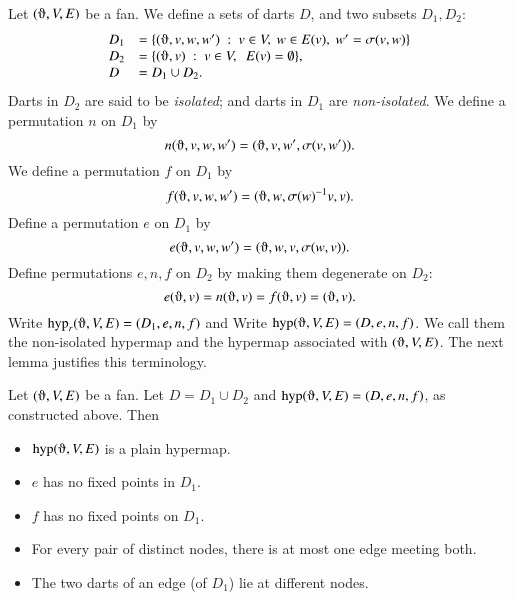 Let $(\orgn,V,E)$ be a fan.  We define a sets of darts $D$, and
two subsets $D_1,D_2$:
    $$
    \begin{array}{lll}
    D_1 &= \{(\orgn,v,w,w')\mid v\in V,\ w\in E(v),\ w' = \sigma(v,w)\}\\
    D_2 &= \{(\orgn,v) \mid v\in V,\ \ E(v) = \emptyset\},\\
    D   &= D_1\cup D_2.
    \end{array}
    $$
Darts in $D_2$ are said to be {\it isolated}; and darts in $D_1$ are {\it non-isolated}.
%
We define a permutation $n$ on $D_1$ by
    $$n(\orgn,v,w,w') = (\orgn,v,w',\sigma(v,w')).$$
We define a permutation $f$ on $D_1$ by
    $$
    f (\orgn,v,w,w') = (\orgn,w,\sigma(w)^{-1} v,v).
    $$
Define a permutation $e$ on $D_1$ by
    $$
    e (\orgn,v,w,w') = (\orgn,w,v,\sigma(w,v)).
    $$
Define permutations $e,n,f$ on $D_2$ by making them degenerate on $D_2$:
    $$
    e (\orgn,v) = n(\orgn,v) = f(\orgn,v) = (\orgn,v).
    $$
Write $\op{hyp}_r(\orgn,V,E)=(D_1,e,n,f)$ and
Write $\op{hyp}(\orgn,V,E)=(D,e,n,f)$.  We call them the non-isolated hypermap
and the hypermap associated with $(\orgn,V,E)$.  The next
lemma justifies this terminology.



\begin{lemma}
Let $(\orgn,V,E)$ be a fan.  Let $D = D_1\cup D_2$
and $\op{hyp}(\orgn,V,E) = (D,e,n,f)$, as constructed above.  Then
    \begin{itemize}
    \item $\op{hyp}(\orgn,V,E)$ is a plain hypermap.
    \item  $e$ has no fixed
points in $D_1$.
    \item  $f$ has no fixed points on $D_1$.
    \item For every pair of distinct nodes, there is at most one
    edge meeting both.
    \item The two darts of an edge (of $D_1$) lie at different nodes.
    \end{itemize}
\end{lemma}

